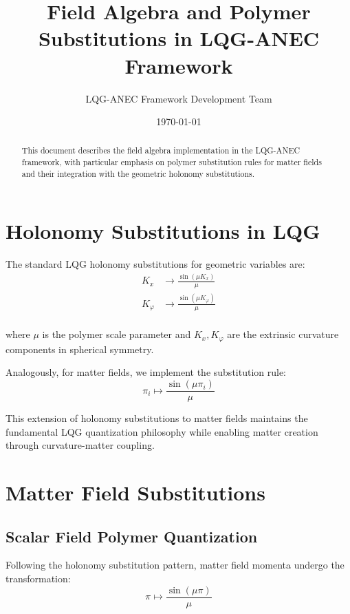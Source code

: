 \documentclass[11pt]{article}
\title{Field Algebra and Polymer Substitutions in LQG-ANEC Framework}
\author{LQG-ANEC Framework Development Team}
\date{\today}
\begin{document}
\maketitle

\begin{abstract}
This document describes the field algebra implementation in the LQG-ANEC framework, with particular emphasis on polymer substitution rules for matter fields and their integration with the geometric holonomy substitutions.
\end{abstract}

\section{Holonomy Substitutions in LQG}

The standard LQG holonomy substitutions for geometric variables are:
\begin{align}
K_x &\rightarrow \frac{\sin(\mu K_x)}{\mu} \\
K_\varphi &\rightarrow \frac{\sin(\mu K_\varphi)}{\mu} \\
\end{align}

where $\mu$ is the polymer scale parameter and $K_x, K_\varphi$ are the extrinsic curvature components in spherical symmetry.

Analogously, for matter fields, we implement the substitution rule:
\begin{equation}
\pi_i \mapsto \frac{\sin(\mu \pi_i)}{\mu}
\end{equation}

This extension of holonomy substitutions to matter fields maintains the fundamental LQG quantization philosophy while enabling matter creation through curvature-matter coupling.

\section{Matter Field Substitutions}

\subsection{Scalar Field Polymer Quantization}

Following the holonomy substitution pattern, matter field momenta undergo the transformation:
\begin{equation}
\pi \mapsto \frac{\sin(\mu \pi)}{\mu}
\end{equation}
\end{document}
